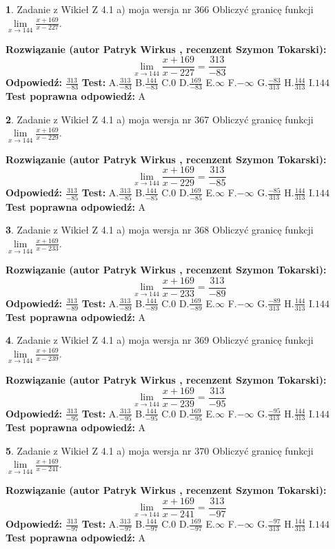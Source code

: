 \documentclass[12pt, a4paper]{article}
\theoremstyle{definition} %
\newtheorem{zad}{}
\newcommand{\zadStart}[1]{\begin{zad}#1\newline}
\newcommand{\zadStop}{\end{zad}}
\newcommand{\rozwStart}[2]{\noindent \textbf{Rozwiązanie (autor #1 , recenzent #2): }\newline}
\newcommand{\rozwStop}{\newline}
\newcommand{\odpStart}{\noindent \textbf{Odpowiedź:}\newline}
\newcommand{\odpStop}{\newline}
\newcommand{\testStart}{\noindent \textbf{Test:}\newline}
\newcommand{\testStop}{\newline}
\newcommand{\kluczStart}{\noindent \textbf{Test poprawna odpowiedź:}\newline}
\newcommand{\kluczStop}{\newline}
\begin{document}
\zadStart{Zadanie z Wikieł Z 4.1 a) moja wersja nr 366}
Obliczyć granicę funkcji $\lim\limits_{x\to144}\frac{x+169}{x-227}$.
\zadStop
\rozwStart{Patryk Wirkus}{Szymon Tokarski}
$$\lim\limits_{x\to144}\frac{x+169}{x-227} = \frac{313}{-83}$$
\rozwStop
\odpStart
$\frac{313}{-83}$
\odpStop
\testStart
A.$\frac{313}{-83}$
B.$\frac{144}{-83}$
C.$0$
D.$\frac{169}{-83}$
E.$\infty$
F.$-\infty$
G.$\frac{-83}{313}$
H.$\frac{144}{313}$
I.$144$
\testStop
\kluczStart
A
\kluczStop



\zadStart{Zadanie z Wikieł Z 4.1 a) moja wersja nr 367}
Obliczyć granicę funkcji $\lim\limits_{x\to144}\frac{x+169}{x-229}$.
\zadStop
\rozwStart{Patryk Wirkus}{Szymon Tokarski}
$$\lim\limits_{x\to144}\frac{x+169}{x-229} = \frac{313}{-85}$$
\rozwStop
\odpStart
$\frac{313}{-85}$
\odpStop
\testStart
A.$\frac{313}{-85}$
B.$\frac{144}{-85}$
C.$0$
D.$\frac{169}{-85}$
E.$\infty$
F.$-\infty$
G.$\frac{-85}{313}$
H.$\frac{144}{313}$
I.$144$
\testStop
\kluczStart
A
\kluczStop



\zadStart{Zadanie z Wikieł Z 4.1 a) moja wersja nr 368}
Obliczyć granicę funkcji $\lim\limits_{x\to144}\frac{x+169}{x-233}$.
\zadStop
\rozwStart{Patryk Wirkus}{Szymon Tokarski}
$$\lim\limits_{x\to144}\frac{x+169}{x-233} = \frac{313}{-89}$$
\rozwStop
\odpStart
$\frac{313}{-89}$
\odpStop
\testStart
A.$\frac{313}{-89}$
B.$\frac{144}{-89}$
C.$0$
D.$\frac{169}{-89}$
E.$\infty$
F.$-\infty$
G.$\frac{-89}{313}$
H.$\frac{144}{313}$
I.$144$
\testStop
\kluczStart
A
\kluczStop



\zadStart{Zadanie z Wikieł Z 4.1 a) moja wersja nr 369}
Obliczyć granicę funkcji $\lim\limits_{x\to144}\frac{x+169}{x-239}$.
\zadStop
\rozwStart{Patryk Wirkus}{Szymon Tokarski}
$$\lim\limits_{x\to144}\frac{x+169}{x-239} = \frac{313}{-95}$$
\rozwStop
\odpStart
$\frac{313}{-95}$
\odpStop
\testStart
A.$\frac{313}{-95}$
B.$\frac{144}{-95}$
C.$0$
D.$\frac{169}{-95}$
E.$\infty$
F.$-\infty$
G.$\frac{-95}{313}$
H.$\frac{144}{313}$
I.$144$
\testStop
\kluczStart
A
\kluczStop



\zadStart{Zadanie z Wikieł Z 4.1 a) moja wersja nr 370}
Obliczyć granicę funkcji $\lim\limits_{x\to144}\frac{x+169}{x-241}$.
\zadStop
\rozwStart{Patryk Wirkus}{Szymon Tokarski}
$$\lim\limits_{x\to144}\frac{x+169}{x-241} = \frac{313}{-97}$$
\rozwStop
\odpStart
$\frac{313}{-97}$
\odpStop
\testStart
A.$\frac{313}{-97}$
B.$\frac{144}{-97}$
C.$0$
D.$\frac{169}{-97}$
E.$\infty$
F.$-\infty$
G.$\frac{-97}{313}$
H.$\frac{144}{313}$
I.$144$
\testStop
\kluczStart
A
\kluczStop
\end{document}
